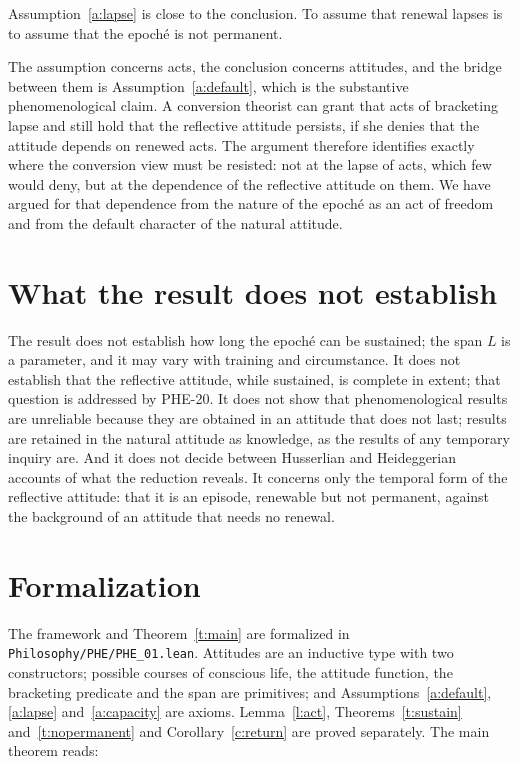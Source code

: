 \documentclass{situationist-preprint}
\begin{document}
\begin{objection}
Assumption~\ref{a:lapse} is close to the conclusion. To assume that renewal lapses is to assume that the epoché is not permanent.
\end{objection}

\begin{reply}
The assumption concerns acts, the conclusion concerns attitudes, and the bridge between them is Assumption~\ref{a:default}, which is the substantive phenomenological claim. A conversion theorist can grant that acts of bracketing lapse and still hold that the reflective attitude persists, if she denies that the attitude depends on renewed acts. The argument therefore identifies exactly where the conversion view must be resisted: not at the lapse of acts, which few would deny, but at the dependence of the reflective attitude on them. We have argued for that dependence from the nature of the epoché as an act of freedom and from the default character of the natural attitude.
\end{reply}

\section{What the result does not establish}

The result does not establish how long the epoché can be sustained; the span $L$ is a parameter, and it may vary with training and circumstance. It does not establish that the reflective attitude, while sustained, is complete in extent; that question is addressed by PHE-20. It does not show that phenomenological results are unreliable because they are obtained in an attitude that does not last; results are retained in the natural attitude as knowledge, as the results of any temporary inquiry are. And it does not decide between Husserlian and Heideggerian accounts of what the reduction reveals. It concerns only the temporal form of the reflective attitude: that it is an episode, renewable but not permanent, against the background of an attitude that needs no renewal.

\section{Formalization}\label{s:formal}

The framework and Theorem~\ref{t:main} are formalized in \nolinkurl{Philosophy/PHE/PHE_01.lean}. Attitudes are an inductive type with two constructors; possible courses of conscious life, the attitude function, the bracketing predicate and the span are primitives; and Assumptions~\ref{a:default}, \ref{a:lapse} and~\ref{a:capacity} are axioms. Lemma~\ref{l:act}, Theorems~\ref{t:sustain} and~\ref{t:nopermanent} and Corollary~\ref{c:return} are proved separately. The main theorem reads:
\end{document}
